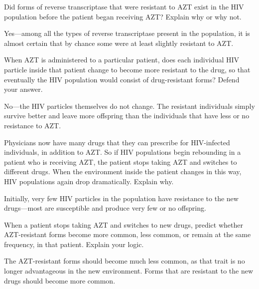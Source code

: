\documentclass[11pt]{exam}
\begin{document}
\begin{questions}

\question
Did forms of reverse transcriptase that were resistant to AZT exist in the HIV
population before the patient began receiving AZT? Explain why or why not.

\begin{solution}
    Yes---among all the types of reverse transcriptase present in the
    population, it is almost certain that by chance some were at least slightly
    resistant to AZT.
\end{solution}

\newpage

\question
When AZT is administered to a particular patient, does each individual HIV
particle inside that patient change to become more resistant to the drug, so
that eventually the HIV population would consist of drug-resistant forms?
Defend your answer.

\begin{solution}
    No---the HIV particles themselves do not change. The resistant individuals
    simply survive better and leave more offspring than the individuals that
    have less or no resistance to AZT.
\end{solution}


\question
Physicians now have many drugs that they can prescribe for HIV-infected
individuals, in addition to AZT. So if HIV populations begin rebounding in a
patient who is receiving AZT, the patient stops taking AZT and switches to
different drugs. When the environment inside the patient changes in this way,
HIV populations again drop dramatically. Explain why.

\begin{solution}
    Initially, very few HIV particles in the population have resistance to the
    new drugs---most are susceptible and produce very few or no offspring.
\end{solution}


\question
When a patient stops taking AZT and switches to new drugs, predict whether
AZT-resistant forms become more common, less common, or remain at the same
frequency, in that patient. Explain your logic.

\begin{solution}
    The AZT-resistant forms should become much less common, as that trait is no
    longer advantageous in the new environment. Forms that are resistant to the
    new drugs should become more common.
\end{solution}


\end{questions}
\end{document}
